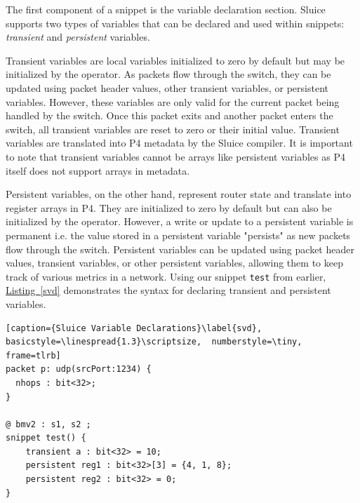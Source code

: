 \documentclass[12pt, oneside]{article}
\newcommand{\irref}[2]{\hyperref[#2]{#1~\ref{#2}}}
\begin{document}
The first component of a snippet is the variable declaration section. Sluice supports two types of variables that can be declared and used within snippets: \textit{transient} and \textit{persistent} variables. 

Transient variables are local variables initialized to zero by default but may be initialized by the operator. As packets flow through the switch, they can be updated using packet header values, other transient variables, or persistent variables. However, these variables are only valid for the current packet being handled by the switch. Once this packet exits and another packet enters the switch, all transient variables are reset to zero or their initial value. Transient variables are translated into P4 metadata by the Sluice compiler. It is important to note that transient variables cannot be arrays like persistent variables as P4 itself does not support arrays in metadata. 

Persistent variables, on the other hand, represent router state and translate into register arrays in P4. They are initialized to zero by default but can also be initialized by the operator. However, a write or update to a persistent variable is permanent i.e. the value stored in a persistent variable "persists" as new packets flow through the switch. Persistent variables can be updated using packet header values, transient variables, or other persistent variables, allowing them to keep track of various metrics in a network. Using our snippet \texttt{test} from earlier, \irref{Listing}{svd} demonstrates the syntax for declaring transient and persistent variables. 

\begin{lstlisting}[caption={Sluice Variable Declarations}\label{svd}, basicstyle=\linespread{1.3}\scriptsize,  numberstyle=\tiny, frame=tlrb]
packet p: udp(srcPort:1234) {
  nhops : bit<32>;
}

@ bmv2 : s1, s2 ;
snippet test() {
    transient a : bit<32> = 10;
    persistent reg1 : bit<32>[3] = {4, 1, 8};
    persistent reg2 : bit<32> = 0;
}
\end{lstlisting}
\end{document}
